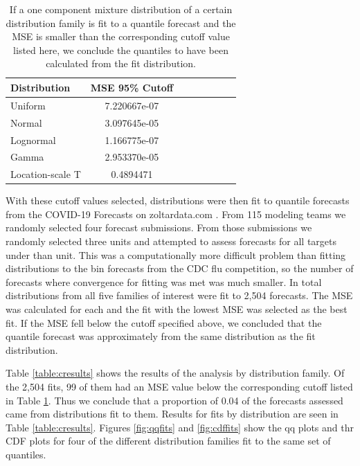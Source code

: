\documentclass[11pt,notitlepage]{isuthesis}
\begin{document}
\begin{table}[h!]
  \centering
  \begin{tabular}{l*{6}{c}r}
  Distribution          & MSE 95\% Cutoff \\
  \hline
  Uniform               & 7.220667e-07   \\
  Normal                & 3.097645e-05  \\
  Lognormal             & 1.166775e-07  \\
  Gamma                 & 2.953370e-05  \\
  Location-scale T      & 0.4894471 \\
  \end{tabular}
  \begin{center}
\begin{minipage}{10cm}
\captionsetup{font=scriptsize}
  \caption[Quantile cutoff values]{If a one component mixture distribution of a
  certain distribution family
  is fit to a quantile forecast and the MSE is smaller than
  the corresponding cutoff value listed here, we conclude the quantiles to 
  have been calculated from the fit distribution.}
  \label{table:quantcutoffs}
  \end{minipage}
  \end{center}
\end{table}


With these cutoff values selected, distributions were then fit to quantile 
forecasts
from the COVID-19 Forecasts on zoltardata.com \cite[]{zoltarcovid}.
From 115 modeling teams we randomly selected four forecast submissions. From 
those submissions we randomly selected three units and attempted to assess
forecasts for all targets under than unit.
This was a computationally more
difficult problem than fitting distributions to the bin forecasts from the CDC
flu competition, so the number of forecasts where convergence for fitting was
met was much smaller. In total distributions from all five families of interest
were fit to 2,504 forecasts. 
The MSE was calculated for each and the fit with the
lowest MSE was selected as the best fit. If the MSE fell below the cutoff
specified above, we concluded that the quantile forecast was approximately
from the same distribution as the fit distribution. 

Table \ref{table:cresults} shows the results of the analysis by distribution
family.
Of the 2,504 fits, 99 of 
them had an MSE value below the corresponding cutoff listed in Table
\ref{table:quantcutoffs}. Thus we conclude that a proportion of 0.04 of the 
forecasts assessed came from distributions fit to them.
Results for fits by
distribution are seen in Table \ref{table:cresults}.
Figures \ref{fig:qqfits} and \ref{fig:cdffits} show the qq plots and thr CDF 
plots
for four of the different distribution families fit to the same set of quantiles.
\end{document}
